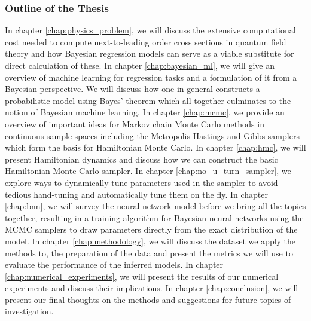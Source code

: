 \subsubsection*{Outline of the Thesis}
In chapter \ref{chap:physics_problem}, we will discuss the extensive computational cost needed to compute next-to-leading order cross sections in quantum field theory and how Bayesian regression models can serve as a viable substitute for direct calculation of these. 
In chapter \ref{chap:bayesian_ml}, we will give an overview of machine learning for regression tasks and a formulation of it from a Bayesian perspective. We will discuss how one in general constructs a probabilistic model using Bayes' theorem which all together culminates to the notion of Bayesian machine learning.
In chapter \ref{chap:mcmc}, we provide an overview of important ideas for Markov chain Monte Carlo methods in continuous sample spaces including the Metropolis-Hastings and Gibbs samplers which form the basis for Hamiltonian Monte Carlo. In chapter \ref{chap:hmc}, we will present Hamiltonian dynamics and discuss how we can construct the basic Hamiltonian Monte Carlo sampler. 
In chapter \ref{chap:no_u_turn_sampler}, we explore ways to dynamically tune parameters used in the sampler to avoid tedious hand-tuning and automatically tune them on the fly. In chapter \ref{chap:bnn}, we will survey the neural network model before we bring all the topics together, resulting in a training algorithm for Bayesian neural networks using the MCMC samplers to draw parameters directly from the exact distribution of the model. In chapter \ref{chap:methodology}, we will discuss the dataset we apply the methods to, the preparation of the data and present the metrics we will use to evaluate the performance of the inferred models. In chapter \ref{chap:numerical_experiments}, we will present the results of our numerical experiments and discuss their implications. In chapter \ref{chap:conclusion}, we will present our final thoughts on the methods and suggestions for future topics of investigation.


\begin{comment}
    The two most common classes are weight-space symmetry and scaling symmetry. The first symmetry refers to the case where two layers can be permuted and still produce the same prediction. The second symmetry arise when using non-linear function that obey $\sigma(\alpha x) = \alpha\sigma(x)$. The second symmetry can be removed entirely by avoidance of non-linear function of this form but the first symmetry is an unavoidable one. Thus many equivalent parameterizations exist which manifest itself as a multi-modal distribution that can be notoriously difficult to infer parameters from.
\end{comment}